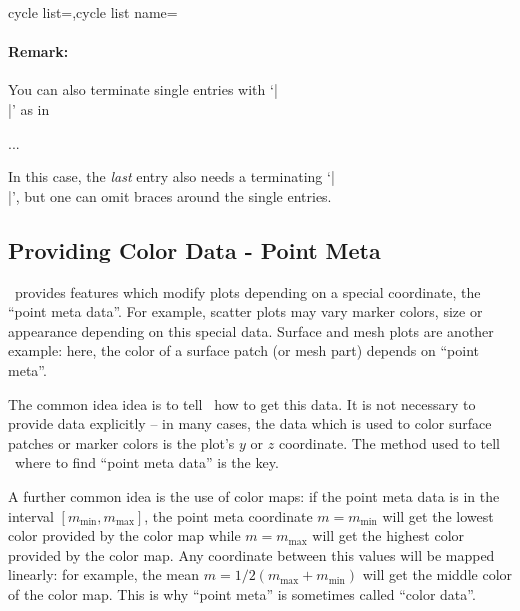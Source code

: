 \begin{pgfplotskeylist}{cycle list=,cycle list name=}
\paragraph{Remark:} You can also terminate single entries with `|\\|' as in
\begin{codeexample}
\begin{axis}[cycle list={%
	blue,mark=*\\%
	red,mark=square\\%
	dashed,mark=o\\%
	loosely dotted,mark=+\\%
	brown!60!black,
		mark options={fill=brown!40},
		mark=otimes*\\}
]
...
\end{axis}
\end{codeexample}
In this case, the \emph{last} entry also needs a terminating `|\\|', but one can omit braces around the single entries.
\end{pgfplotskeylist}

\subsection{Providing Color Data - Point Meta}
\label{pgfplots:point:meta}
\PGFPlots\ provides features which modify plots depending on a special coordinate, the ``point meta data''. For example, scatter plots may vary marker colors, size or appearance depending on this special data. Surface and mesh plots are another example: here, the color of a surface patch (or mesh part) depends on ``point meta''.

The common idea idea is to tell \PGFPlots\ how to get this data. It is not necessary to provide data explicitly -- in many cases, the data which is used to color surface patches or marker colors is the plot's $y$ or $z$ coordinate. The method used to tell \PGFPlots\ where to find ``point meta data'' is the  key. 

A further common idea is the use of color maps: if the point meta data is in the interval $[m_{\text{min}},m_{\text{max}}]$, the point meta coordinate $m = m_{\text{min}}$ will get the lowest color provided by the color map while $m=m_{\text{max}}$ will get the highest color provided by the color map. Any coordinate between this values will be mapped linearly: for example, the mean $m = 1/2 (m_{\text{max}} + m_{\text{min}})$ will get the middle color of the color map. This is why ``point meta'' is sometimes called ``color data''.

